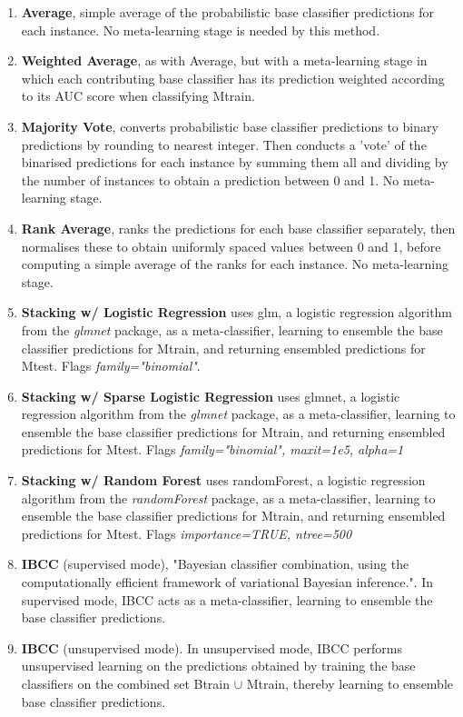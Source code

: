 \documentclass{bioinfo}
\begin{document}
\begin{methods}
\begin{enumerate}
    \item \textbf{Average}, simple average of the probabilistic base classifier predictions for each instance. No meta-learning stage is needed by this method.
    \item \textbf{Weighted Average}, as with Average, but with a meta-learning stage in which each contributing base classifier has its prediction weighted according to its AUC score when classifying Mtrain.
    \item \textbf{Majority Vote}, converts probabilistic base classifier predictions to binary predictions by rounding to nearest integer. Then conducts a 'vote' of the binarised predictions for each instance by summing them all and dividing by the number of instances to obtain a prediction between 0 and 1. No meta-learning stage.
    \item \textbf{Rank Average}, ranks the predictions for each base classifier separately, then normalises these to obtain uniformly spaced values between 0 and 1, before computing a simple average of the ranks for each instance. No meta-learning stage.
    \item \textbf{Stacking w/ Logistic Regression} uses glm, a logistic regression algorithm from the \textit{glmnet} package, as a meta-classifier, learning to ensemble the base classifier predictions for Mtrain, and returning ensembled predictions for Mtest. Flags \textit{family="binomial"}.
    \item \textbf{Stacking w/ Sparse Logistic Regression} uses glmnet, a logistic regression algorithm from the \textit{glmnet} package, as a meta-classifier, learning to ensemble the base classifier predictions for Mtrain, and returning ensembled predictions for Mtest. Flags \textit{family="binomial", maxit=1e5, alpha=1}
    \item \textbf{Stacking w/ Random Forest} uses randomForest, a logistic regression algorithm from the \textit{randomForest} package, as a meta-classifier, learning to ensemble the base classifier predictions for Mtrain, and returning ensembled predictions for Mtest. Flags \textit{importance=TRUE, ntree=500}
    \item \textbf{IBCC} (supervised mode), "Bayesian classifier combination, using the computationally efficient framework of variational Bayesian inference."\cite{Simpson13}. In supervised mode, IBCC acts as a meta-classifier, learning to ensemble the base classifier predictions.
    \item \textbf{IBCC} (unsupervised mode). In unsupervised mode, IBCC performs unsupervised learning on the predictions obtained by training the base classifiers on the combined set Btrain $\cup$ Mtrain, thereby learning to ensemble base classifier predictions.
\end{enumerate}


\end{methods}
\end{document}
